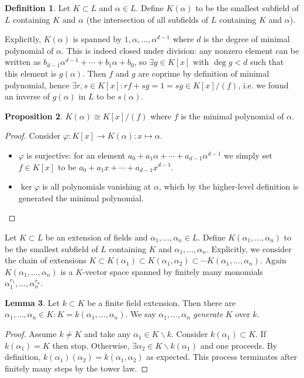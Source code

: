 \documentclass{article}
\theoremstyle{definition}
\newtheorem{defn}{Definition}[subsection]
\newtheorem{prop}[defn]{Proposition}
\newtheorem{lemma}[defn]{Lemma}
\begin{document}
\begin{defn}
Let $K\subset L$ and $\alpha\in L$. Define $K(\alpha)$ to be the smallest subfield of $L$ containing $K$ and $\alpha$ (the intersection of all subfields of $L$ containing $K$ and $\alpha$).

Explicitly, $K(\alpha)$ is spanned by $1,\alpha,\ldots,\alpha^{d-1}$ where $d$ is the degree of minimal polynomial of $\alpha$. This is indeed closed under division: any nonzero element can be written as $b_{d-1}\alpha^{d-1}+\cdots+b_1\alpha+b_0$, so $\exists g\in K[x]$ with $\deg g<d$ such that this element is $g(\alpha)$. Then $f$ and $g$ are coprime by definition of minimal polynomial, hence $\exists r,s\in K[x]:rf+sg=1=sg\in K[x]/(f)$, i.e. we found an inverse of $g(\alpha)$ in $L$ to be $s(\alpha)$.
\end{defn}

\begin{prop}
$K(\alpha)\cong K[x]/(f)$ where $f$ is the minimal polynomial of $\alpha$.
\end{prop}
\begin{proof}
Consider $\varphi:K[x]\rightarrow K(\alpha):x\mapsto\alpha$.
\begin{itemize}
\item $\varphi$ is surjective: for an element $a_0+a_1\alpha+\cdots+a_{d-1}\alpha^{d-1}$ we simply set $f\in K[x]$ to be $a_0+a_1x+\cdots+a_{d-1}x^{d-1}$.
\item $\ker\varphi$ is all polynomials vanishing at $\alpha$, which by the higher-level definition is generated the minimal polynomial.
\end{itemize}
\end{proof}

Let $K\subset L$ be an extension of fields and $\alpha_1,\ldots,\alpha_n\in L$. Define $K(\alpha_1,\ldots,\alpha_n)$ to be the smallest subfield of $L$ containing $K$ and $\alpha_1,\ldots,\alpha_n$. Explicitly, we consider the chain of extensions $K\subset K(\alpha_1)\subset K(\alpha_1,\alpha_2)\subset\cdots K(\alpha_1,\ldots,\alpha_n)$. Again $K(\alpha_1,\ldots,\alpha_n)$ is a $K$-vector space spanned by finitely many monomials $\alpha_1^{r_1},\ldots,\alpha_n^{r_n}$.

\begin{lemma}
\label{lemma:finitefext}
Let $k\subset K$ be a finite field extension. Then there are $\alpha_1,\ldots,\alpha_n\in K:K=k(\alpha_1,\ldots,\alpha_n)$. We say $\alpha_1,\ldots,\alpha_n$ \textit{generate} $K$ over $k$.
\end{lemma}
\begin{proof}
Assume $k\neq K$ and take any $\alpha_1\in K\backslash k$. Consider $k(\alpha_1)\subset K$. If $k(\alpha_1)=K$ then stop. Otherwise, $\exists \alpha_2\in K\backslash k(\alpha_1)$ and one proceeds. By definition, $k(\alpha_1)(\alpha_2)=k(\alpha_1,\alpha_2)$ as expected. This process terminates after finitely many steps by the tower law.
\end{proof}
\end{document}
